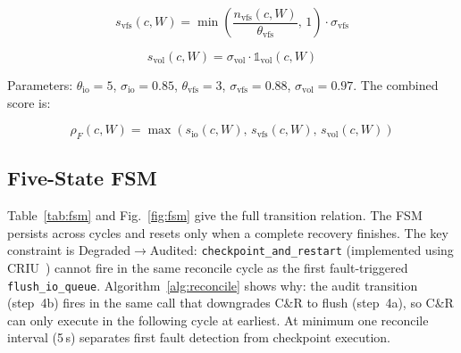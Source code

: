 \documentclass[conference]{IEEEtran}
\begin{document}
\begin{equation}
s_{\mathrm{vfs}}(c, W) = \min\!\left(\frac{n_{\mathrm{vfs}}(c, W)}{\theta_{\mathrm{vfs}}},\, 1\right) \cdot \sigma_{\mathrm{vfs}}
\label{eq:svfs}
\end{equation}

\begin{equation}
s_{\mathrm{vol}}(c, W) = \sigma_{\mathrm{vol}} \cdot \mathbb{1}_{\mathrm{vol}}(c, W)
\label{eq:svol}
\end{equation}

Parameters: $\theta_{\mathrm{io}} = 5$, $\sigma_{\mathrm{io}} = 0.85$, $\theta_{\mathrm{vfs}} = 3$, $\sigma_{\mathrm{vfs}} = 0.88$, $\sigma_{\mathrm{vol}} = 0.97$. The combined score is:

\begin{equation}
\rho_F(c, W) = \max(s_{\mathrm{io}}(c, W),\, s_{\mathrm{vfs}}(c, W),\, s_{\mathrm{vol}}(c, W))
\label{eq:rhoF}
\end{equation}

\subsection{Five-State FSM}

Table~\ref{tab:fsm} and Fig.~\ref{fig:fsm} give the full transition relation. The FSM persists across cycles and resets only when a complete recovery finishes. The key constraint is Degraded$\rightarrow$Audited: \texttt{checkpoint\_and\_restart} (implemented using CRIU~\cite{b2}) cannot fire in the same reconcile cycle as the first fault-triggered \texttt{flush\_io\_queue}. Algorithm~\ref{alg:reconcile} shows why: the audit transition (step~4b) fires in the same call that downgrades C\&R to flush (step~4a), so C\&R can only execute in the following cycle at earliest. At minimum one reconcile interval (5\,s) separates first fault detection from checkpoint execution.
\end{document}
